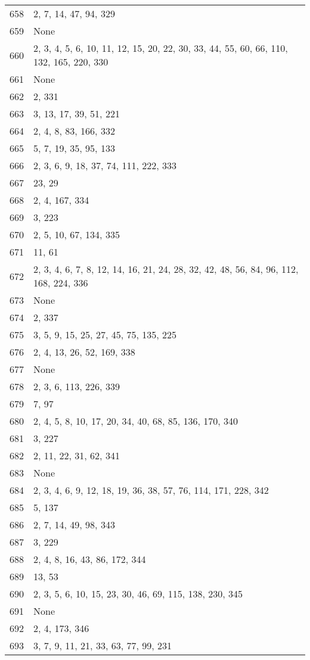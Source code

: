 \documentclass[12pt]{article}
\begin{document}
\begin{tabular}{|r|l|}
658 & 2, 7, 14, 47, 94, 329 \\ 
659 & None \\ 
660 & 2,  3, 4, 5, 6, 10, 11, 12, 15, 20, 22, 30, 33, 44,  55, 60, 66, 110, 132, 165, 220, 330 \\ 
661 & None \\ 
662 & 2, 331 \\ 
663 & 3, 13, 17, 39, 51, 221 \\ 
664 & 2, 4, 8, 83, 166, 332 \\ 
665 & 5, 7, 19, 35, 95, 133 \\ 
666 & 2, 3, 6, 9, 18, 37, 74, 111, 222, 333 \\ 
667 & 23, 29 \\ 
668 & 2, 4, 167, 334 \\ 
669 & 3, 223 \\ 
670 & 2, 5, 10, 67, 134, 335 \\ 
671 & 11, 61 \\ 
672 & 2, 3, 4,  6, 7, 8, 12, 14, 16, 21, 24, 28, 32, 42, 48, 56, 84, 96, 112, 168,  224, 336 \\ 
673 & None \\ 
674 & 2, 337 \\ 
675 & 3, 5, 9, 15, 25,  27, 45, 75, 135, 225 \\ 
676 & 2, 4, 13, 26, 52, 169, 338 \\ 
677 & None \\ 
678 & 2, 3, 6, 113, 226,  339 \\ 
679 & 7, 97 \\ 
680 & 2, 4, 5, 8, 10, 17, 20, 34, 40, 68, 85, 136, 170, 340 \\ 
681 & 3, 227 \\ 
682 & 2, 11, 22, 31, 62, 341 \\ 
683 & None \\ 
684 & 2, 3, 4, 6, 9,  12, 18, 19, 36, 38, 57, 76, 114, 171, 228, 342 \\ 
685 & 5, 137 \\ 
686 & 2, 7, 14, 49, 98, 343 \\ 
687 & 3, 229 \\ 
688 & 2, 4, 8, 16, 43, 86, 172, 344 \\ 
689 & 13, 53 \\ 
690 & 2, 3, 5, 6, 10, 15, 23, 30, 46, 69, 115, 138,  230, 345 \\ 
691 & None \\ 
692 & 2, 4,  173, 346 \\ 
693 & 3, 7, 9, 11, 21, 33, 63, 77, 99, 231 \\ 

\end{tabular}
\end{document}
